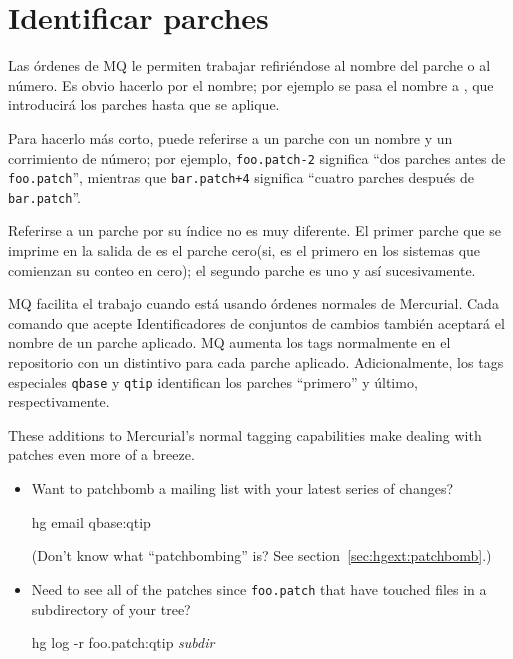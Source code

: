 \section{Identificar parches}

Las órdenes de MQ le permiten trabajar refiriéndose al nombre del
parche o al número.  Es obvio hacerlo por el nombre; por ejemplo se
pasa el nombre  a , que
introducirá los parches hasta que  se aplique.  

Para hacerlo más corto, puede referirse a un parche con un nombre y un
corrimiento de número; por ejemplo,  \texttt{foo.patch-2} significa
``dos parches antes de \texttt{foo.patch}'', mientras que
\texttt{bar.patch+4} significa ``cuatro parches después de \texttt{bar.patch}''.

Referirse a un parche por su índice no es muy diferente.  El primer
parche que se imprime en la salida de  es el
parche cero(si, es el primero en los sistemas que comienzan su conteo
en cero); el segundo parche es uno y así sucesivamente.

MQ facilita el trabajo cuando está usando órdenes normales de
Mercurial.  Cada comando que acepte Identificadores de conjuntos de
cambios también aceptará el nombre de un parche aplicado.  MQ aumenta
los tags normalmente en el repositorio con un distintivo para cada
parche aplicado.  Adicionalmente, los tags especiales \texttt{qbase} y \texttt{qtip} identifican los parches
``primero'' y último, respectivamente.

These additions to Mercurial's normal tagging capabilities make
dealing with patches even more of a breeze.
\begin{itemize}
\item Want to patchbomb a mailing list with your latest series of
  changes?
  \begin{codesample4}
    hg email qbase:qtip
  \end{codesample4}
  (Don't know what ``patchbombing'' is?  See
  section~\ref{sec:hgext:patchbomb}.)
\item Need to see all of the patches since \texttt{foo.patch} that
  have touched files in a subdirectory of your tree?
  \begin{codesample4}
    hg log -r foo.patch:qtip \emph{subdir}
  \end{codesample4}
\end{itemize}

